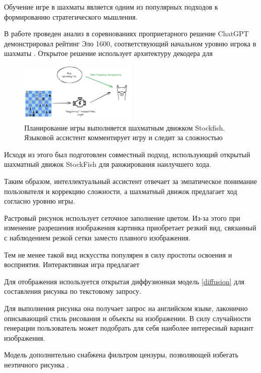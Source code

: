 Обучение игре в шахматы является одним из популярных подходов к формированию стратегического мышления.

В работе \cite{Adam2024} проведен анализ в соревнованиях проприетарного решение ChatGPT демонстрировал рейтинг Эло 1600,
соответствующий начальном уровню игрока в шахматы \cite{elo1967proposed}. Открытое решение \cite{feng2024chessgpt} использует архитектуру декодера для 


\begin{figure}[h]
    \centering
    \includegraphics[width=0.5\textwidth]{assets/work/games/llama-chess.excalidraw.png}
    \caption{Планирование игры выполняется шахматным движком Stockfish. Языковой ассистент комментирует игру и следит за сложностью}
    \label{chess}
\end{figure}

Исходя из этого был подготовлен совместный подход, 
использующий открытый шахматный движок StockFish \cite{acher2016large} для ранжирования наилучшего хода. 

Таким образом, интеллектуальный ассистент отвечает за эмпатическое понимание пользователя и коррекцию сложности,
а шахматный движок предлагает ход согласно уровню игры.



Растровый рисунок использует сеточное заполнение цветом. Из-за этого при изменение разрешения изображения картинка приобретает
резкий вид, связанный с наблюдением резкой сетки заместо плавного изображения.

Тем не менее такой вид искусства популярен в силу простоты освоения и восприятия. Интерактивная игра предлагает 

Для отображения используется открытая диффузионная модель \ref{diffusion} для составления рисунка по текстовому запросу. 

Для выполнения рисунка она получает запрос на английском языке, лаконично описывающий стиль рисования и объекты на изображении.
В силу случайности генерации пользователь может подобрать для себя наиболее интересный вариант изображения.

Модель дополнительно снабжена фильтром цензуры, позволяющей избегать неэтичного рисунка \cite{radford2021learning}.

